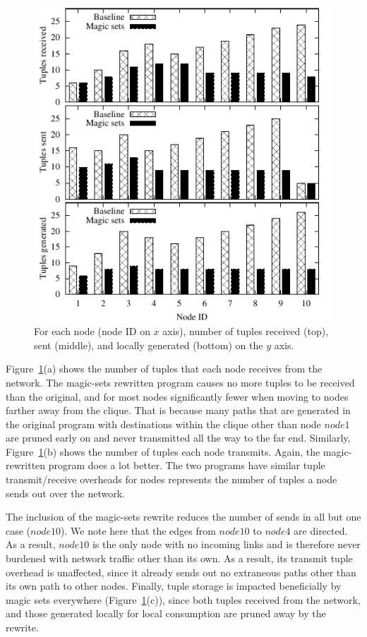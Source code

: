 \begin{figure}
\centering
\includegraphics{figures/magicNumbers}
\ssp
\caption{For each node (node ID on $x$ axis), number of tuples received
  (top), sent (middle), and locally generated (bottom) on the $y$ axis.}
\label{ch:evita:fig:magicresults}
\end{figure}

Figure~\ref{ch:evita:fig:magicresults}(a) shows the number of tuples that each
node receives from the network.  The magic-sets rewritten program causes no
more tuples to be received than the original, and for most nodes significantly
fewer when moving to nodes farther away from the clique.  That is because many
paths that are generated in the original program with destinations within the
clique other than node $node1$ are pruned early on and never transmitted all the
way to the far end.  Similarly, Figure~\ref{ch:evita:fig:magicresults}(b) shows
the number of tuples each node transmits.  Again, the magic-rewritten program
does a lot better.  The two programs have similar tuple transmit/receive
overheads for nodes represents the number of tuples a node sends out over the
network.  

The inclusion of the magic-sets rewrite reduces the number of sends in all but
one case ($node10$).  We note here that the edges from $node10$ to $node4$ are
directed.  As a result, $node10$ is the only node with no incoming links and is
therefore never burdened with network traffic other than its own.  As a result,
its transmit tuple overhead is unaffected, since it already sends out no
extraneous paths other than its own path to other nodes.  Finally, tuple
storage is impacted beneficially by magic sets everywhere
(Figure~\ref{ch:evita:fig:magicresults}(c)), since both  tuples
received from the network, and those generated locally for local consumption
are pruned away by the rewrite.



